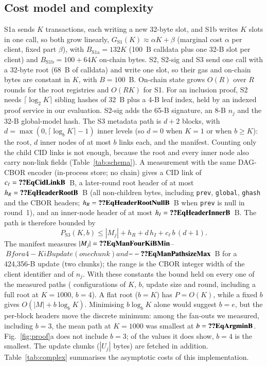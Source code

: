 \documentclass[final,3p,times,twocolumn]{elsarticle}
\begin{document}
\subsection{Cost model and complexity}
S1a sends $K$ transactions, each writing a new 32-byte slot, and S1b writes $K$ slots in one call, so both grow linearly, $G_{\mathrm{S1}}(K)\approx \alpha K+\beta$ (marginal cost $\alpha$ per client, fixed part $\beta$), with $B_{\mathrm{S1a}}=132K$ (100~B calldata plus one 32-B slot per client) and $B_{\mathrm{S1b}}=100+64K$ on-chain bytes. S2, S2-sig and S3 send one call with a 32-byte root (68~B of calldata) and write one slot, so their gas and on-chain bytes are constant in $K$, with $B=100$~B. On-chain state grows $O(R)$ over $R$ rounds for the root registries and $O(RK)$ for S1. For an inclusion proof, S2 needs $\lceil\log_2K\rceil$ sibling hashes of 32~B plus a 4-B leaf index, held by an indexed proof service in our evaluation. S2-sig adds the 65-B signature, an 8-B $n_j$ and the 32-B global-model hash. The S3 metadata path is $d+2$ blocks, with $d=\max(0,\lceil\log_bK\rceil-1)$ inner levels (so $d=0$ when $K=1$ or when $b\ge K$): the root, $d$ inner nodes of at most $b$ links each, and the manifest. Counting only the child CID links is not enough, because the root and every inner node also carry non-link fields (Table~\ref{tab:schema}). A measurement with the same DAG-CBOR encoder (in-process store; no chain) gives a CID link of $c_\ell=\Nm{EqCidLinkB}$~B, a later-round root header of at most $h_R=\Nm{EqHeaderRootB}$~B (all non-children bytes, including \texttt{prev}, \texttt{global}, \texttt{ghash} and the CBOR headers; $h_R=\Nm{EqHeaderRootNullB}$~B when \texttt{prev} is null in round~1), and an inner-node header of at most $h_I=\Nm{EqHeaderInnerB}$~B. The path is therefore bounded by
\begin{equation}
P_{\mathrm{S3}}(K,b)\leq |M_j| + h_R + d\,h_I + c_\ell\,b\,(d+1).
\end{equation}
The manifest measures $|M_j|=\Nm{EqManFourKiBMin}$--$~B for a 4-KiB update (one chunk) and $$--\Nm{EqManPathsizeMax}$~B for a 424,356-B update (two chunks); the range is the CBOR integer width of the client identifier and of $n_j$. With these constants the bound held on every one of the  measured paths ( configurations of $K$, $b$, update size and round, including a full root at $K=1000$, $b=4$). A flat root ($b=K$) has $P=O(K)$, while a fixed $b$ gives $O(|M|+b\log_b K)$. Minimising $b\log_b K$ alone would suggest $b=e$, but the per-block headers move the discrete minimum: among the fan-outs we measured, including $b=3$, the mean path at $K=1000$ was smallest at $b=\Nm{EqArgminB}$. Fig.~\ref{fig:proof}a does not include $b=3$; of the values it does show, $b=4$ is the smallest. The update chunks ($|U_j|$ bytes) are fetched in addition. Table~\ref{tab:complex} summarises the asymptotic costs of this implementation.
\end{document}

